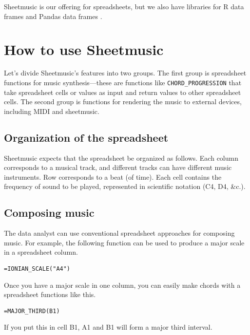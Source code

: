 \documentclass{acm_proc_article-sp}
\begin{document}
Sheetmusic is our offering for spreadsheets, but we
also have libraries for R data frames \cite{ddr} and Pandas
data frames \cite{ddpy}.

\section{How to use Sheetmusic}
Let's divide Sheetmusic's features into two groups. The first group
is spreadsheet functions for music synthesis---these are functions
like \texttt{CHORD\_PROGRESSION} that take spreadsheet cells or values
as input and return values to other spreadsheet cells. The second
group is functions for rendering the music to external devices,
including MIDI and sheetmusic.

\subsection{Organization of the spreadsheet}
Sheetmusic expects that the spreadsheet be organized as follows.
Each column corresponds
to a musical track, and different tracks can have different music instruments.
Row corresponds to a beat (of time).
Each cell contains the frequency of sound to be played, represented
in scientific notation (C4, D4, \&c.).

\subsection{Composing music}
The data analyst can use conventional spreadsheet approaches for
composing music. For example, the following function can be used
to produce a major scale in a spreadsheet column.

\begin{verbatim}=IONIAN_SCALE("A4")\end{verbatim}

Once you have a major scale in one column, you can easily make
chords with a spreadsheet functions like this.

\begin{verbatim}=MAJOR_THIRD(B1)\end{verbatim}

If you put this in cell B1, A1 and B1 will form a major third interval.
\end{document}
